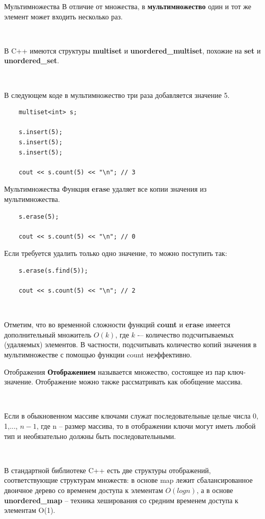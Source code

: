 \documentclass{beamer}
\begin{document}
\begin{frame}[fragile]{Мультимножества}
    В отличие от множества, в \textbf{мультимножество} один и тот же элемент может входить несколько раз. 
    
    ~
    
    В C++ имеются структуры \textbf{multiset} и \textbf{unordered\_multiset}, похожие на \textbf{set} и \textbf{unordered_set}. 
    
    ~
    
    В следующем коде в мультимножество три раза добавляется значение 5.
    \begin{verbatim}
    multiset<int> s;
    
    s.insert(5);
    s.insert(5);
    s.insert(5);
    
    cout << s.count(5) << "\n"; // 3
    \end{verbatim}
\end{frame}

\begin{frame}[fragile]{Мультимножества}    
    Функция \textbf{erase} удаляет все копии значения из мультимножества.
    
    \begin{verbatim}
    s.erase(5);

    cout << s.count(5) << "\n"; // 0
    \end{verbatim}
    
    Если требуется удалить только одно значение, то можно поступить так:
    \begin{verbatim}
    s.erase(s.find(5));
    
    cout << s.count(5) << "\n"; // 2
    \end{verbatim}
    
    ~
    
    Отметим, что во временной сложности функций \textbf{count} и \textbf{erase} имеется дополнительный множитель $O(k)$, где $k$ -– количество подсчитываемых (удаляемых) элементов. В частности, подсчитывать количество копий значения в мультимножестве с помощью функции count неэффективно.
\end{frame}

\begin{frame}[fragile]{Отображения}
    \textbf{Отображением} называется множество, состоящее из пар ключ-значение. Отображение можно также рассматривать как обобщение массива.
    
    ~
    
    Если в обыкновенном массиве ключами служат последовательные целые числа 0, 1,..., $n−1$, где n – размер массива, то в отображении ключи могут иметь любой тип и необязательно должны быть последовательными.
    
    ~
    
    В стандартной библиотеке C++ есть две структуры отображений, соответствующие структурам множеств: в основе map лежит сбалансированное двоичное дерево со временем доступа к элементам $O(log n)$, а в основе \textbf{unordered\_map} – техника хеширования со средним временем доступа к элементам O(1).
\end{frame}
\end{document}
